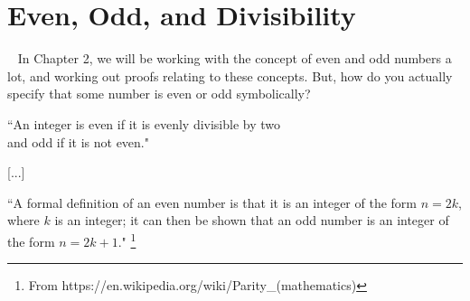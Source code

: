 \documentclass[a4paper,12pt]{book}
\begin{document}
    \newpage

    \section*{Even, Odd, and Divisibility}

        \begin{intro}{\ }
            In Chapter 2, we will be working with the concept of even and
            odd numbers a lot, and working out proofs relating to these concepts.
            But, how do you actually specify that some number is even or odd symbolically?

            \begin{center}
                ``An integer is even if it is evenly divisible by two\\ and odd if it is not even."

                [...]

                ``A formal definition of an even number is that it is an integer of the form $n = 2k$,
                where $k$ is an integer;
                it can then be shown that an odd number is an integer of the form $n = 2k + 1$."
                \footnote{From https://en.wikipedia.org/wiki/Parity\_(mathematics)}
            \end{center}

        \end{intro}
\end{document}
